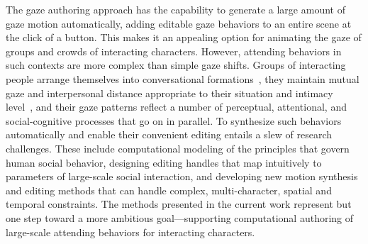 The gaze authoring approach has the capability to generate a large amount of gaze motion automatically, adding editable gaze behaviors to an entire scene at the click of a button. This makes it an appealing option for animating the gaze of groups and crowds of interacting characters. However, attending behaviors in such contexts are more complex than simple gaze shifts. Groups of interacting people arrange themselves into conversational formations~\citep{kendon2010spacing}, they maintain mutual gaze and interpersonal distance appropriate to their situation and intimacy level~\citep{argyle1965eyecontact}, and their gaze patterns reflect a number of perceptual, attentional, and social-cognitive processes that go on in parallel. To synthesize such behaviors automatically and enable their convenient editing entails a slew of research challenges. These include computational modeling of the principles that govern human social behavior, designing editing handles that map intuitively to parameters of large-scale social interaction, and developing new motion synthesis and editing methods that can handle complex, multi-character, spatial and temporal constraints. The methods presented in the current work represent but one step toward a more ambitious goal---supporting computational authoring of large-scale attending behaviors for interacting characters.